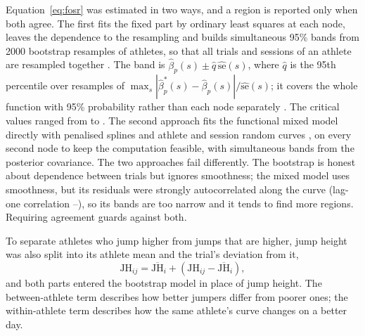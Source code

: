 Equation~\eqref{eq:fosr} was estimated in two ways, and a region is reported only when both agree. The first fits the fixed part by ordinary least squares at each node, leaves the dependence to the resampling and builds simultaneous 95\% bands from 2000 bootstrap resamples of athletes, so that all trials and sessions of an athlete are resampled together \parencite{efron1993}. The band is $\hat\beta_p(s) \pm \hat q\,\widehat{\mathrm{se}}(s)$, where $\hat q$ is the 95th percentile over resamples of $\max_s |\hat\beta^{*}_p(s) - \hat\beta_p(s)| / \widehat{\mathrm{se}}(s)$; it covers the whole function with 95\% probability rather than each node separately \parencite{ruppert2003}. The critical values ranged from \simCritMin{} to \simCritMax. The second approach fits the functional mixed model directly with penalised splines and athlete and session random curves \parencite{scheipl2015,goldsmith2011}, on every second node to keep the computation feasible, with simultaneous bands from the posterior covariance. The two approaches fail differently. The bootstrap is honest about dependence between trials but ignores smoothness; the mixed model uses smoothness, but its residuals were strongly autocorrelated along the curve (lag-one correlation \residLagMin--\residLagMax), so its bands are too narrow and it tends to find more regions. Requiring agreement guards against both.

To separate athletes who jump higher from jumps that are higher, jump height was also split into its athlete mean and the trial's deviation from it,
\begin{equation}
\mathrm{JH}_{ij} = \overline{\mathrm{JH}}_{i} + (\mathrm{JH}_{ij} - \overline{\mathrm{JH}}_{i}),
\label{eq:wb}
\end{equation}
and both parts entered the bootstrap model in place of jump height. The between-athlete term describes how better jumpers differ from poorer ones; the within-athlete term describes how the same athlete's curve changes on a better day.

